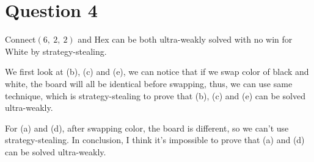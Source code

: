 \documentclass{article}[12pt]
\begin{document}
\section{Question 4}

Connect$(6, \ 2, \ 2)$ and Hex can be both ultra-weakly solved with no win for White by strategy-stealing. 

We first look at (b), (c) and (e), we can notice that if we swap color of black and white, the board will all be identical before swapping, thus, we can use same technique, which is strategy-stealing to prove that (b), (c) and (e) can be solved ultra-weakly.

For (a) and (d), after swapping color, the board is different, so we can't use strategy-stealing. In conclusion, I think it's impossible to prove that (a) and (d) can be solved ultra-weakly.
\end{document}
